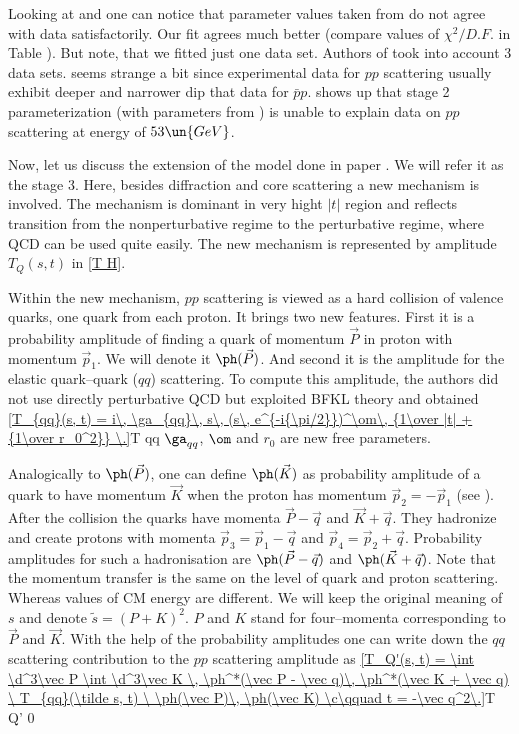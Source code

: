 Looking at \fgs{}  and  one can notice that parameter values taken from  do not agree with data satisfactorily. Our fit agrees much better (compare values of $\chi^2/D.F.$ in Table ). But note, that we fitted just one data set. Authors of  took into account 3 data sets. \Fg{}  seems strange a bit since experimental data for $pp$ scattering usually exhibit deeper and narrower dip that data for $\bar pp$. \Fg{}  shows up that stage 2 parameterization (with parameters from ) is unable to explain data on $pp$ scattering at energy of $53\un{GeV}$.

Now, let us discuss the extension of the model done in paper . We will refer it as the stage 3. Here, besides diffraction and core scattering a new mechanism is involved. The mechanism is dominant in very hight $|t|$ region and reflects transition from the nonperturbative regime to the perturbative regime, where QCD can be used quite easily. The new mechanism is represented by amplitude $T_Q(s, t)$ in \equ{} \ref{T H}. 

Within the new mechanism, $pp$ scattering is viewed as a hard collision of valence quarks, one quark from each proton. It brings two new features. First it is a probability amplitude of finding a quark of momentum $\vec P$ in proton with momentum $\vec p_1$. We will denote it $\ph(\vec P)$. And second it is the amplitude for the elastic quark--quark ($qq$) scattering. To compute this amplitude, the authors did not use directly perturbative QCD but exploited BFKL theory and obtained
\eqref{T_{qq}(s, t) = i\, \ga_{qq}\, s\, (s\, e^{-i{\pi/2}})^\om\, {1\over |t| + {1\over r_0^2}} \.}{T qq}
$\ga_{qq}$, $\om$ and $r_0$ are new free parameters.

Analogically to $\ph(\vec P)$, one can define $\ph(\vec K)$ as probability amplitude of a quark to have momentum $\vec K$ when the proton has momentum $\vec p_2=-\vec p_1$ (see \fg{} ). After the collision the quarks have momenta $\vec P - \vec q$ and $\vec K + \vec q$. They hadronize and create protons with momenta $\vec p_3 = \vec p_1 - \vec q$ and $\vec p_4 = \vec p_2 + \vec q$. Probability amplitudes for such a hadronisation are $\ph(\vec P - \vec q)$ and $\ph(\vec K + \vec q)$. Note that the momentum transfer is the same on the level of quark and proton scattering. Whereas values of CM energy are different. We will keep the original meaning of $s$ and denote $\tilde s = (P + K)^2$. $P$ and $K$ stand for four--momenta corresponding to $\vec P$ and $\vec K$. With the help of the probability amplitudes one can write down the $qq$ scattering contribution to the $pp$ scattering amplitude as
\eqref{T_Q'(s, t) = \int \d^3\vec P \int \d^3\vec K \, \ph^*(\vec P - \vec q)\, \ph^*(\vec K + \vec q) \ T_{qq}(\tilde s, t) \  \ph(\vec P)\, \ph(\vec K) \c\qquad t = -\vec q^2\.}{T Q' 0}


